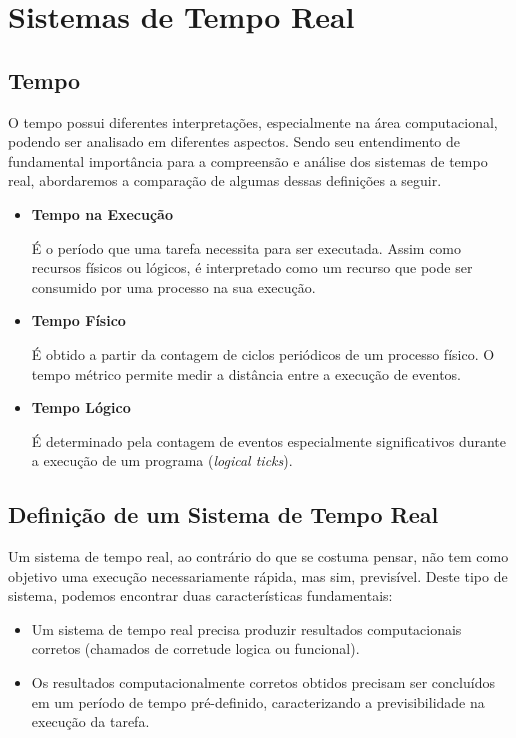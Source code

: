 \section{Sistemas de Tempo Real}

\subsection{Tempo}
O tempo possui diferentes interpretações, especialmente na área computacional,
podendo ser analisado em diferentes aspectos. Sendo seu entendimento de
fundamental importância para a compreensão e análise dos sistemas de tempo
real, abordaremos a comparação de algumas dessas definições a seguir.~\cite{Motus199321}

\begin{itemize}
\item \textbf{Tempo na Execução}

É o período que uma tarefa necessita para ser executada. Assim como recursos
físicos ou lógicos, é interpretado como um recurso que pode ser consumido
por uma processo na sua execução.

\item \textbf{Tempo Físico}

É obtido a partir da contagem de ciclos periódicos de um processo físico.
O tempo métrico permite medir a distância entre a execução de eventos.

\item \textbf{Tempo Lógico}

É determinado pela contagem de eventos especialmente significativos durante a execução de
um programa (\textit{logical ticks}).

\end{itemize}

\subsection{Definição de um Sistema de Tempo Real}
Um sistema de tempo real, ao contrário do que se costuma pensar, não tem
como objetivo uma execução necessariamente rápida, mas sim, previsível.
Deste tipo de sistema, podemos encontrar duas características fundamentais:

\begin{itemize}
\item Um sistema de tempo real precisa produzir resultados computacionais corretos
(chamados de corretude logica ou funcional).
\item Os resultados computacionalmente corretos obtidos precisam ser concluídos em
um período de tempo pré-definido, caracterizando a previsibilidade na execução da tarefa.
\end{itemize}

